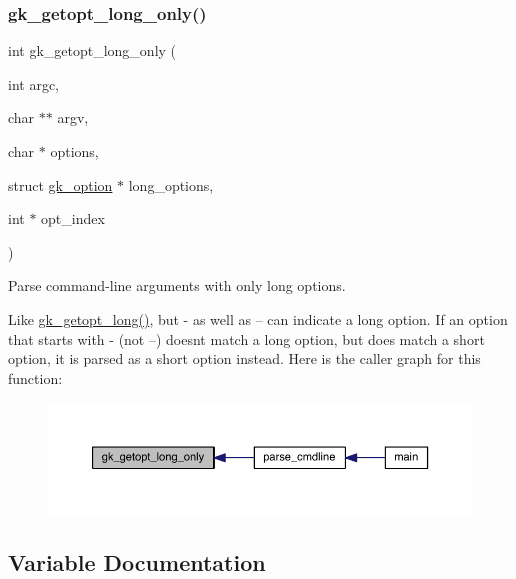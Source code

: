 \subsubsection{\texorpdfstring{gk\+\_\+getopt\+\_\+long\+\_\+only()}{gk\_getopt\_long\_only()}}
{\footnotesize\ttfamily int gk\+\_\+getopt\+\_\+long\+\_\+only (\begin{DoxyParamCaption}\item[{int}]{argc,  }\item[{char $\ast$$\ast$}]{argv,  }\item[{char $\ast$}]{options,  }\item[{struct \hyperlink{a00630}{gk\+\_\+option} $\ast$}]{long\+\_\+options,  }\item[{int $\ast$}]{opt\+\_\+index }\end{DoxyParamCaption})}



Parse command-\/line arguments with only long options. 

Like \hyperlink{a00038_a1c3b8d80bd9620dc66f24d4854c0f6d3}{gk\+\_\+getopt\+\_\+long()}, but \textquotesingle{}-\/\textquotesingle{} as well as \textquotesingle{}--\textquotesingle{} can indicate a long option. If an option that starts with \textquotesingle{}-\/\textquotesingle{} (not \textquotesingle{}--\textquotesingle{}) doesn\textquotesingle{}t match a long option, but does match a short option, it is parsed as a short option instead. Here is the caller graph for this function\+:\nopagebreak
\begin{figure}[H]
\begin{center}
\leavevmode
\includegraphics[width=350pt]{a00050_a26fc3b9b5c3c4973ee60c3f1daeb02cd_icgraph}
\end{center}
\end{figure}


\subsection{Variable Documentation}
\mbox{\label{a00050_a7e251e946564d7de41aa8f602b94e74e}} 
